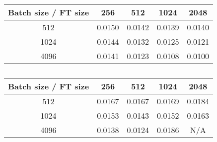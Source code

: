 \begin{table}[H]
\centering
\begin{tabular}{|c|c|c|c|c|}
\hline
Batch size / FT size & 256 & 512 & 1024 & 2048 \\
\hline
512 & 0.0150 & 0.0142 & 0.0139 & 0.0140 \\
1024 & 0.0144 & 0.0132 & 0.0125 & 0.0121 \\
4096 & 0.0141 & 0.0123 & 0.0108 & 0.0100 \\
\hline
\end{tabular}
\caption{}
\label{tab:baseline}
\end{table}
\begin{table}[H]
\centering
\begin{tabular}{|c|c|c|c|c|}
\hline
Batch size / FT size & 256 & 512 & 1024 & 2048 \\
\hline
512 & 0.0167 & 0.0167 & 0.0169 & 0.0184 \\
1024 & 0.0153 & 0.0143 & 0.0152 & 0.0163 \\
4096 & 0.0138 & 0.0124 & 0.0186 & N/A \\
\hline
\end{tabular}
\caption{}
\label{tab:baseline}
\end{table}
